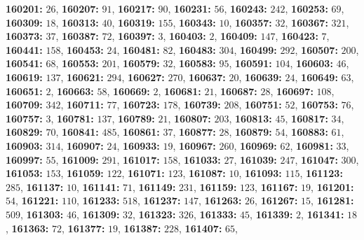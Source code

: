 \textsf{\bfseries 160201:} $26$, \textsf{\bfseries 160207:} $91$, \textsf{\bfseries 160217:} $90$, \textsf{\bfseries 160231:} $56$, \textsf{\bfseries 160243:} $242$, \textsf{\bfseries 160253:} $69$, \textsf{\bfseries 160309:} $18$, \textsf{\bfseries 160313:} $40$, \textsf{\bfseries 160319:} $155$, \textsf{\bfseries 160343:} $10$, \textsf{\bfseries 160357:} $32$, \textsf{\bfseries 160367:} $321$, \textsf{\bfseries 160373:} $37$, \textsf{\bfseries 160387:} $72$, \textsf{\bfseries 160397:} $3$, \textsf{\bfseries 160403:} $2$, \textsf{\bfseries 160409:} $147$, \textsf{\bfseries 160423:} $7$, \textsf{\bfseries 160441:} $158$, \textsf{\bfseries 160453:} $24$, \textsf{\bfseries 160481:} $82$, \textsf{\bfseries 160483:} $304$, \textsf{\bfseries 160499:} $292$, \textsf{\bfseries 160507:} $200$, \textsf{\bfseries 160541:} $68$, \textsf{\bfseries 160553:} $201$, \textsf{\bfseries 160579:} $32$, \textsf{\bfseries 160583:} $95$, \textsf{\bfseries 160591:} $104$, \textsf{\bfseries 160603:} $46$, \textsf{\bfseries 160619:} $137$, \textsf{\bfseries 160621:} $294$, \textsf{\bfseries 160627:} $270$, \textsf{\bfseries 160637:} $20$, \textsf{\bfseries 160639:} $24$, \textsf{\bfseries 160649:} $63$, \textsf{\bfseries 160651:} $2$, \textsf{\bfseries 160663:} $58$, \textsf{\bfseries 160669:} $2$, \textsf{\bfseries 160681:} $21$, \textsf{\bfseries 160687:} $28$, \textsf{\bfseries 160697:} $108$, \textsf{\bfseries 160709:} $342$, \textsf{\bfseries 160711:} $77$, \textsf{\bfseries 160723:} $178$, \textsf{\bfseries 160739:} $208$, \textsf{\bfseries 160751:} $52$, \textsf{\bfseries 160753:} $76$, \textsf{\bfseries 160757:} $3$, \textsf{\bfseries 160781:} $137$, \textsf{\bfseries 160789:} $21$, \textsf{\bfseries 160807:} $203$, \textsf{\bfseries 160813:} $45$, \textsf{\bfseries 160817:} $34$, \textsf{\bfseries 160829:} $70$, \textsf{\bfseries 160841:} $485$, \textsf{\bfseries 160861:} $37$, \textsf{\bfseries 160877:} $28$, \textsf{\bfseries 160879:} $54$, \textsf{\bfseries 160883:} $61$, \textsf{\bfseries 160903:} $314$, \textsf{\bfseries 160907:} $24$, \textsf{\bfseries 160933:} $19$, \textsf{\bfseries 160967:} $260$, \textsf{\bfseries 160969:} $62$, \textsf{\bfseries 160981:} $33$, \textsf{\bfseries 160997:} $55$, \textsf{\bfseries 161009:} $291$, \textsf{\bfseries 161017:} $158$, \textsf{\bfseries 161033:} $27$, \textsf{\bfseries 161039:} $247$, \textsf{\bfseries 161047:} $300$, \textsf{\bfseries 161053:} $153$, \textsf{\bfseries 161059:} $122$, \textsf{\bfseries 161071:} $123$, \textsf{\bfseries 161087:} $10$, \textsf{\bfseries 161093:} $115$, \textsf{\bfseries 161123:} $285$, \textsf{\bfseries 161137:} $10$, \textsf{\bfseries 161141:} $71$, \textsf{\bfseries 161149:} $231$, \textsf{\bfseries 161159:} $123$, \textsf{\bfseries 161167:} $19$, \textsf{\bfseries 161201:} $54$, \textsf{\bfseries 161221:} $110$, \textsf{\bfseries 161233:} $518$, \textsf{\bfseries 161237:} $147$, \textsf{\bfseries 161263:} $26$, \textsf{\bfseries 161267:} $15$, \textsf{\bfseries 161281:} $509$, \textsf{\bfseries 161303:} $46$, \textsf{\bfseries 161309:} $32$, \textsf{\bfseries 161323:} $326$, \textsf{\bfseries 161333:} $45$, \textsf{\bfseries 161339:} $2$, \textsf{\bfseries 161341:} $18$, \textsf{\bfseries 161363:} $72$, \textsf{\bfseries 161377:} $19$, \textsf{\bfseries 161387:} $228$, \textsf{\bfseries 161407:} $65$, 
